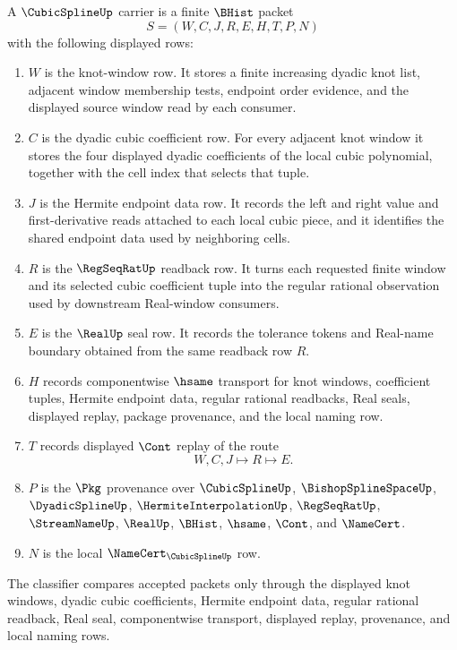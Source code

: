 \begin{definition}
\label{def:cubic-spline-real-window-carrier}
A $\CubicSplineUp$ carrier is a finite $\BHist$ packet
$$
S=(W,C,J,R,E,H,T,P,N)
$$
with the following displayed rows:
\begin{enumerate}
\item $W$ is the knot-window row. It stores a finite increasing dyadic knot list, adjacent window membership tests, endpoint order evidence, and the displayed source window read by each consumer.
\item $C$ is the dyadic cubic coefficient row. For every adjacent knot window it stores the four displayed dyadic coefficients of the local cubic polynomial, together with the cell index that selects that tuple.
\item $J$ is the Hermite endpoint data row. It records the left and right value and first-derivative reads attached to each local cubic piece, and it identifies the shared endpoint data used by neighboring cells.
\item $R$ is the $\RegSeqRatUp$ readback row. It turns each requested finite window and its selected cubic coefficient tuple into the regular rational observation used by downstream Real-window consumers.
\item $E$ is the $\RealUp$ seal row. It records the tolerance tokens and Real-name boundary obtained from the same readback row $R$.
\item $H$ records componentwise $\hsame$ transport for knot windows, coefficient tuples, Hermite endpoint data, regular rational readbacks, Real seals, displayed replay, package provenance, and the local naming row.
\item $T$ records displayed $\Cont$ replay of the route
$$
W,C,J \longmapsto R \longmapsto E .
$$
\item $P$ is the $\Pkg$ provenance over $\CubicSplineUp$, $\BishopSplineSpaceUp$, $\DyadicSplineUp$, $\HermiteInterpolationUp$, $\RegSeqRatUp$, $\StreamNameUp$, $\RealUp$, $\BHist$, $\hsame$, $\Cont$, and $\NameCert$.
\item $N$ is the local $\NameCert_{\CubicSplineUp}$ row.
\end{enumerate}
The classifier compares accepted packets only through the displayed knot windows, dyadic cubic coefficients, Hermite endpoint data, regular rational readback, Real seal, componentwise transport, displayed replay, provenance, and local naming rows.
\end{definition}

